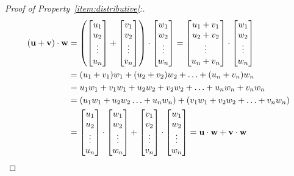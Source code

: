 \documentclass{ximera}
\renewcommand{\vec}[1]{{\bf #1}}
\newcommand{\dotp}{\cdot}
\begin{document}
\begin{proof}[Proof of Property~\ref{item:distributive}:]

\begin{align*}
\left(\vec{u}+\vec{v}\right)\dotp \vec{w}&=\left(\begin{bmatrix} u_1\\ u_2\\ \vdots\\ u_n \end{bmatrix}+\begin{bmatrix} v_1\\ v_2\\ \vdots\\ v_n \end{bmatrix}\right)\dotp \begin{bmatrix}w_1\\w_2\\\vdots\\w_n\end{bmatrix}=\begin{bmatrix}
u_1+v_1\\
u_2+v_2\\
\vdots\\
u_n+v_n
\end{bmatrix}\dotp \begin{bmatrix}w_1\\w_2\\\vdots\\w_n\end{bmatrix}\\
&=(u_1+v_1)w_1+
(u_2+v_2)w_2+
\ldots+
(u_n+v_n)w_n\\
&=u_1w_1+v_1w_1+
u_2w_2+v_2w_2+
\ldots+
u_nw_n+v_nw_n\\
&=(u_1w_1+
u_2w_2\ldots+u_nw_n)+(v_1w_1+v_2w_2+
\ldots
+v_nw_n)\\
&=\begin{bmatrix}
u_1\\
u_2\\
\vdots\\
u_n
\end{bmatrix}\dotp\begin{bmatrix}w_1\\w_2\\\vdots\\w_n\end{bmatrix}+\begin{bmatrix}
v_1\\
v_2\\
\vdots\\
v_n
\end{bmatrix}\dotp \begin{bmatrix}w_1\\w_2\\\vdots\\w_n\end{bmatrix}
=\vec{u}\dotp\vec{w}+\vec{v}\dotp\vec{w}
\end{align*}
\end{proof}
\end{document}
